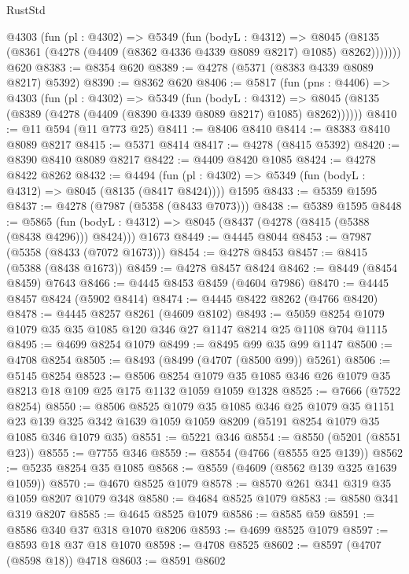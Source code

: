 \begin{lexlean}{RustStd}
\begin{coremodule}
      @4303
        (fun (pl : @4302) =>
        @5349
          (fun (bodyL : @4312) =>
          @8045 (@8135 (@8361 (@4278 (@4409 (@8362 @4336 @4339 @8089 @8217) @1085) @8262)))))))
    @620
@8383 := @8354 @620
@8389 := @4278 (@5371 (@8383 @4339 @8089 @8217) @5392)
@8390 := @8362 @620
@8406 := @5817
    (fun (pns : @4406) =>
    @4303
      (fun (pl : @4302) =>
      @5349
        (fun (bodyL : @4312) =>
        @8045 (@8135 (@8389 (@4278 (@4409 (@8390 @4339 @8089 @8217) @1085) @8262))))))
@8410 := @11 @594 (@11 @773 @25)
@8411 := @8406 @8410
@8414 := @8383 @8410 @8089 @8217
@8415 := @5371 @8414
@8417 := @4278 (@8415 @5392)
@8420 := @8390 @8410 @8089 @8217
@8422 := @4409 @8420 @1085
@8424 := @4278 @8422 @8262
@8432 := @4494
    (fun (pl : @4302) => @5349 (fun (bodyL : @4312) => @8045 (@8135 (@8417 @8424))))
    @1595
@8433 := @5359 @1595
@8437 := @4278 (@7987 (@5358 (@8433 @7073)))
@8438 := @5389 @1595
@8448 := @5865
    (fun (bodyL : @4312) => @8045 (@8437 (@4278 (@8415 (@5388 (@8438 @4296))) @8424)))
    @1673
@8449 := @4445 @8044
@8453 := @7987 (@5358 (@8433 (@7072 @1673)))
@8454 := @4278 @8453
@8457 := @8415 (@5388 (@8438 @1673))
@8459 := @4278 @8457 @8424
@8462 := @8449 (@8454 @8459) @7643
@8466 := @4445 @8453 @8459 (@4604 @7986)
@8470 := @4445 @8457 @8424 (@5902 @8414)
@8474 := @4445 @8422 @8262 (@4766 @8420)
@8478 := @4445 @8257 @8261 (@4609 @8102)
@8493 := @5059 @8254 @1079 @1079 @35 @35 @1085 @120 @346 @27 @1147 @8214 @25 @1108 @704 @1115
@8495 := @4699 @8254 @1079
@8499 := @8495 @99 @35 @99 @1147
@8500 := @4708 @8254
@8505 := @8493 (@8499 (@4707 (@8500 @99)) @5261)
@8506 := @5145 @8254
@8523 := @8506
    @8254
    @1079
    @35
    @1085
    @346
    @26
    @1079
    @35
    @8213
    @18
    @109
    @25
    @175
    @1132
    @1059
    @1059
    @1328
@8525 := @7666 (@7522 @8254)
@8550 := @8506
    @8525
    @1079
    @35
    @1085
    @346
    @25
    @1079
    @35
    @1151
    @23
    @139
    @325
    @342
    @1639
    @1059
    @1059
    @8209
    (@5191 @8254 @1079 @35 @1085 @346 @1079 @35)
@8551 := @5221 @346
@8554 := @8550 (@5201 (@8551 @23))
@8555 := @7755 @346
@8559 := @8554 (@4766 (@8555 @25 @139))
@8562 := @5235 @8254 @35 @1085
@8568 := @8559 (@4609 (@8562 @139 @325 @1639 @1059))
@8570 := @4670 @8525 @1079
@8578 := @8570 @261 @341 @319 @35 @1059 @8207 @1079 @348
@8580 := @4684 @8525 @1079
@8583 := @8580 @341 @319 @8207
@8585 := @4645 @8525 @1079
@8586 := @8585 @59
@8591 := @8586 @340 @37 @318 @1070 @8206
@8593 := @4699 @8525 @1079
@8597 := @8593 @18 @37 @18 @1070
@8598 := @4708 @8525
@8602 := @8597 (@4707 (@8598 @18)) @4718
@8603 := @8591 @8602

\end{coremodule}
\end{lexlean}
